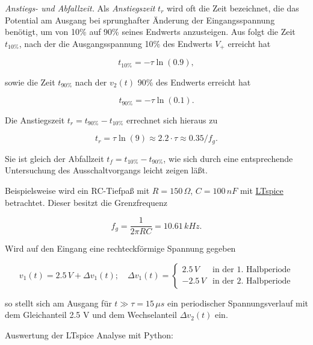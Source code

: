 \documentclass[
  ngerman,
  letterpaper,
]{scrbook}
\begin{document}
\emph{Anstiegs- und Abfallzeit.} Als \emph{Anstiegszeit} \(t_r\) wird
oft die Zeit bezeichnet, die das Potential am Ausgang bei sprunghafter
Änderung der Eingangsspannung benötigt, um von 10\% auf 90\% seines
Endwerts anzusteigen. Aus folgt die Zeit \(t_{10\%}\), nach der die
Ausgangsspannung 10\% des Endwerts \(V_+\) erreicht hat

\[
t_{10\%} = −\tau \ln(0.9),
\]

sowie die Zeit \(t_{90\%}\) nach der \(v_2(t)\) 90\% des Endwerts
erreicht hat

\[
t_{90\%} = −\tau \ln(0.1).
\]

Die Anstiegszeit \(t_r = t_{90\%} − t_{10\%}\) errechnet sich hieraus zu

\[
t_r = \tau \ln(9) \approx 2.2 \cdot \tau \approx 0.35/f_g.
\]

Sie ist gleich der Abfallzeit \(t_f = t_{10\%} − t_{90\%}\), wie sich
durch eine entsprechende Untersuchung des Ausschaltvorgangs leicht
zeigen läßt.

Beispielsweise wird ein RC-Tiefpaß mit \(R = 150\,\Omega\),
\(C = 100\,nF\) mit
\href{https://github.com/mimeiners/gel2/raw/refs/heads/quarto/files/spice/bsp133_reisch.asc}{LTspice}
betrachtet. Dieser besitzt die Grenzfrequenz

\[
f_g = \frac{1}{2 \pi RC} = 10.61\,kHz.
\]

Wird auf den Eingang eine rechteckförmige Spannung gegeben

\[
v_1(t) = 2.5\,V + \Delta v_1(t); \quad 
\Delta v_1(t) = 
\begin{cases}
2.5\,V & \text{in der 1. Halbperiode} \\
-2.5\,V & \text{in der 2. Halbperiode}
\end{cases}
\]

so stellt sich am Ausgang für \(t \gg \tau = 15\,\mu s\) ein
periodischer Spannungsverlauf mit dem Gleichanteil 2.5 V und dem
Wechselanteil \(\Delta v_2(t)\) ein.

Auswertung der LTspice Analyse mit Python:
\end{document}
